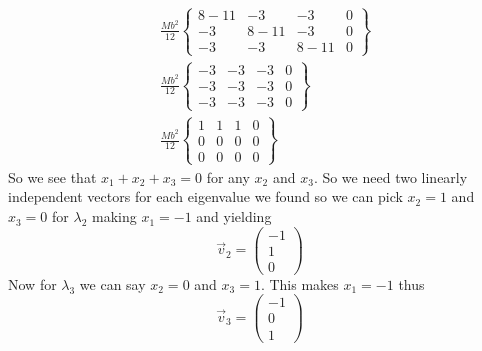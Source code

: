\documentclass[11pt]{article}
\numberwithin{equation}{section}
\begin{document}
\begin{align*}
&\frac{Mb^2}{12}\left\{\begin{array}{cccc}
	8-11	&-3	&-3	&0\\
	-3	&8-11	&-3	&0\\
	-3	&-3	&8-11	&0
		\end{array}\right\}\\
&\frac{Mb^2}{12}\left\{\begin{array}{cccc}
	-3	&-3	&-3	&0\\
	-3	&-3	&-3	&0\\
	-3	&-3	&-3	&0
		\end{array}\right\}\\
&\frac{Mb^2}{12}\left\{\begin{array}{cccc}
	1	&1	&1	&0\\
	0	&0	&0	&0\\
	0	&0	&0	&0
		\end{array}\right\}
\end{align*}
So we see that $x_1+x_2+x_3=0$ for any $x_2$ and $x_3$. So we need two linearly independent vectors for each eigenvalue we found so we can pick $x_2=1$ and $x_3=0$ for $\lambda_2$ making $x_1=-1$ and yielding
$$\vec{v}_2 = \left(\begin{array}{c}
	-1\\ 1\\ 0
	\end{array}\right)$$
Now for $\lambda_3$ we can say $x_2=0$ and $x_3=1$. This makes $x_1=-1$ thus
$$\vec{v}_3 = \left(\begin{array}{c}
	-1\\ 0\\ 1
	\end{array}\right)$$
\end{document}
